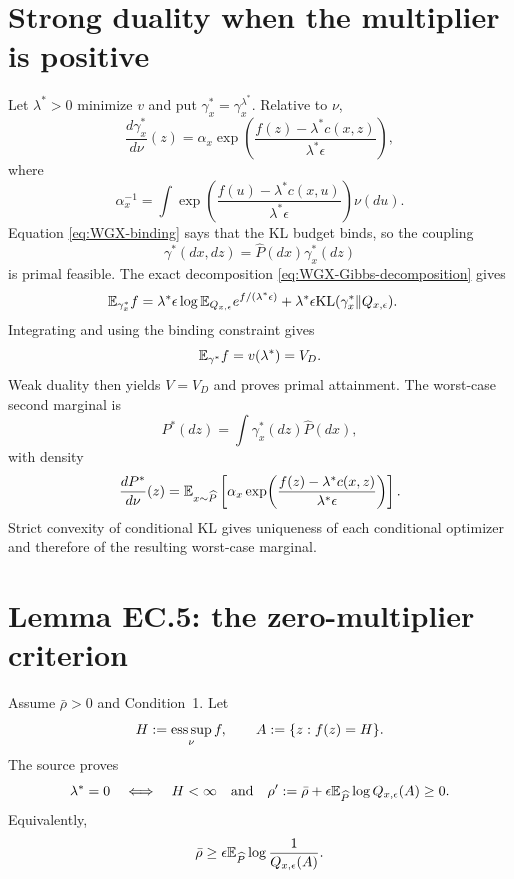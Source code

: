 \section{Strong duality when the multiplier is positive}
Let $\lambda^*>0$ minimize $v$ and put $\gamma_x^*=\gamma_x^{\lambda^*}$.  Relative to $\nu$,
\begin{equation}\label{eq:WGX-gamma-nu}
 \frac{d\gamma_x^*}{d\nu}(z)
 =\alpha_x
 \exp\!\left(
 \frac{f(z)-\lambda^*c(x,z)}{\lambda^*\epsilon}
 \right),
\end{equation}
where
\[
 \alpha_x^{-1}
 =\int\exp\!\left(
 \frac{f(u)-\lambda^*c(x,u)}{\lambda^*\epsilon}
 \right)\nu(du).
\]
Equation \eqref{eq:WGX-binding} says that the KL budget binds, so the coupling
\[
 \gamma^*(dx,dz)=\widehat P(dx)\gamma_x^*(dz)
\]
is primal feasible.  The exact decomposition \eqref{eq:WGX-Gibbs-decomposition} gives
\begin{align*}
 \mathbb{E}_{\gamma_x^*}f
 &=\lambda^*\epsilon
   \log\mathbb{E}_{Q_{x,\epsilon}}e^{f/(\lambda^*\epsilon)}
 +\lambda^*\epsilon
   \mathrm{KL}(\gamma_x^*\|Q_{x,\epsilon}).
\end{align*}
Integrating and using the binding constraint gives
\[
 \mathbb{E}_{\gamma^*}f=v(\lambda^*)=V_D.
\]
Weak duality then yields $V=V_D$ and proves primal attainment.  The worst-case second marginal is
\begin{equation}\label{eq:WGX-Pstar}
 P^*(dz)=\int\gamma_x^*(dz)\widehat P(dx),
\end{equation}
with density
\begin{equation}\label{eq:WGX-Pstar-density}
 \frac{dP^*}{d\nu}(z)
 =\mathbb{E}_{x\sim\widehat P}
 \left[
 \alpha_x\exp\!\left(
 \frac{f(z)-\lambda^*c(x,z)}{\lambda^*\epsilon}
 \right)
 \right].
\end{equation}
Strict convexity of conditional KL gives uniqueness of each conditional optimizer and therefore of the resulting worst-case marginal.

\section{Lemma EC.5: the zero-multiplier criterion}
Assume $\bar\rho>0$ and Condition~1.  Let
\[
 H:=\operatorname*{ess\,sup}_\nu f,
 \qquad
 A:=\{z:f(z)=H\}.
\]
The source proves
\begin{equation}\label{eq:WGX-zero-iff}
 \lambda^*=0
 \quad\Longleftrightarrow\quad
 H<\infty
 \quad\text{and}\quad
 \rho':=\bar\rho+
 \epsilon\mathbb{E}_{\widehat P}\log Q_{x,\epsilon}(A)\ge0.
\end{equation}
Equivalently,
\begin{equation}\label{eq:WGX-radius-threshold}
 \bar\rho\ge
 \epsilon\mathbb{E}_{\widehat P}
 \log\frac1{Q_{x,\epsilon}(A)}.
\end{equation}

